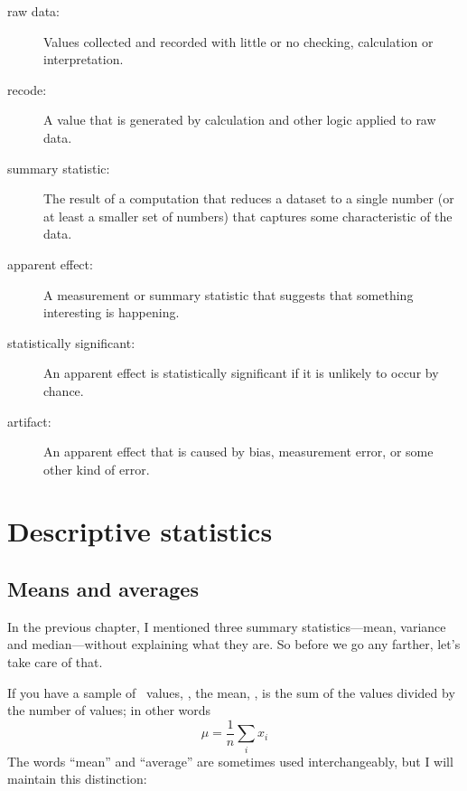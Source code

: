 \documentclass[12pt]{book}
\begin{document}
\begin{description}
\item[raw data:] Values collected and recorded with little or no
checking, calculation or interpretation.

\item[recode:] A value that is generated by calculation and other
logic applied to raw data.

\item[summary statistic:] The result of a computation that reduces
a dataset to a single number (or at least a smaller set of numbers)
that captures some characteristic of the data.

\item[apparent effect:] A measurement or summary statistic that
suggests that something interesting is happening.

\item[statistically significant:] An apparent effect is statistically
  significant if it is unlikely to occur by chance.

\item[artifact:] An apparent effect that is caused by bias,
  measurement error, or some other kind of error.

\end{description}



\chapter{Descriptive statistics}
\label{descriptive}

\section{Means and averages}
\label{mean}

In the previous chapter, I mentioned three summary statistics---mean,
variance and median---without explaining what they are.  So before
we go any farther, let's take care of that.

If you have a sample of \n~values, \xsubi, the mean, \mymu, is
the sum of the values divided by the number of values; in other words
%
\[ \mu = \frac{1}{n} \sum_i x_i \]
%
The words ``mean'' and ``average'' are sometimes used interchangeably,
but I will maintain this distinction:
\end{document}
